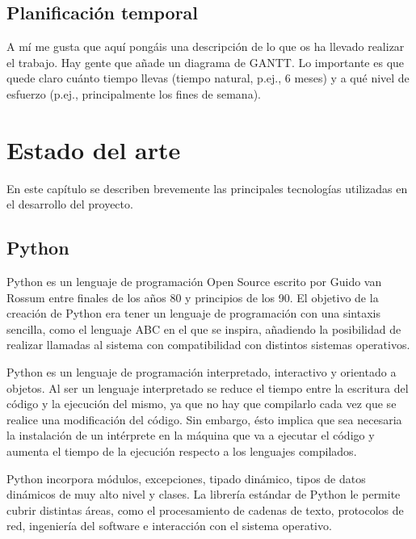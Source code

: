 \documentclass[a4paper, 12pt]{book}
\begin{document}
\section{Planificación temporal}
\label{sec:planificacion-temporal}
A mí me gusta que aquí pongáis una descripción de lo que os ha llevado realizar el trabajo.
Hay gente que añade un diagrama de GANTT.
Lo importante es que quede claro cuánto tiempo llevas (tiempo natural, p.ej., 6 meses) y a qué nivel de esfuerzo (p.ej., principalmente los fines de semana).



\cleardoublepage
\chapter{Estado del arte}
\label{chap:estado}

En este capítulo se describen brevemente las principales tecnologías utilizadas en el desarrollo del proyecto.

\section{Python} 
\label{sec:python}
Python \cite{python} es un lenguaje de programación Open Source escrito por Guido van Rossum entre finales de los años 80 y principios de los 90. El objetivo de la creación de Python era tener un lenguaje de programación con una sintaxis sencilla, como el lenguaje ABC en el que se inspira, añadiendo la posibilidad de realizar llamadas al sistema con compatibilidad con distintos sistemas operativos.

Python es un lenguaje de programación interpretado, interactivo y orientado a objetos. Al ser un lenguaje interpretado se reduce el tiempo entre la escritura del código y la ejecución del mismo, ya que no hay que compilarlo cada vez que se realice una modificación del código. Sin embargo, ésto implica que sea necesaria la instalación de un intérprete en la máquina que va a ejecutar el código y aumenta el tiempo de la ejecución respecto a los lenguajes compilados.

Python incorpora módulos, excepciones, tipado dinámico, tipos de datos dinámicos de muy alto nivel y clases. La librería estándar de Python le permite cubrir distintas áreas, como el procesamiento de cadenas de texto, protocolos de red, ingeniería del software e interacción con el sistema operativo.
\end{document}
